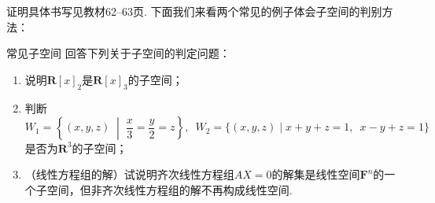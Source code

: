 证明具体书写见教材62--63页. 下面我们来看两个常见的例子体会子空间的判别方法：
\begin{example}{}{常见子空间}
    回答下列关于子空间的判定问题：
    \begin{enumerate}
        \item \label{item:2:常见子空间:1}
              说明$\mathbf{R}[x]_2$是$\mathbf{R}[x]_3$的子空间；

        \item \label{item:2:常见子空间:2}
              判断$W_1=\left\{(x,y,z) \;\middle|\; \dfrac{x}{3}=\dfrac{y}{2}=z\right\},\enspace W_2=\{(x,y,z) \mid x+y+z=1,\enspace x-y+z=1\}$是否为$\mathbf{R}^3$的子空间；

        \item \label{item:2:常见子空间:3}
              （线性方程组的解）试说明齐次线性方程组$AX=0$的解集是线性空间$\mathbf{F}^n$的一个子空间，但非齐次线性方程组的解不再构成线性空间.
    \end{enumerate}
\end{example}

